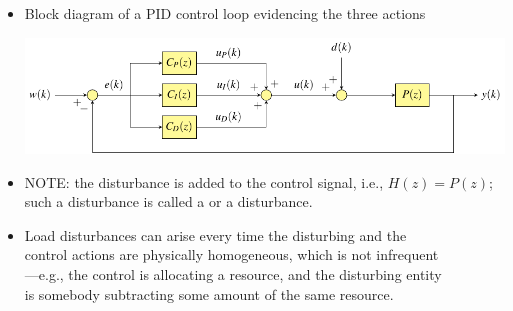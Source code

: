 \begin{frame}
\framesubtitleTC{}
\myPause
 \begin{itemize}[<+-| alert@+>]
 \item Block diagram of a PID control loop evidencing the three actions
       \begin{center}
        \includegraphics[width=0.85\columnwidth]{./Unit-07/img/PIDloop-actions.pdf}
       \end{center}
 \item \vspace{2mm}NOTE: the disturbance is added to the control signal, i.e., $H(z)=P(z)$;\\
       such a disturbance is called a  or a  disturbance.
 \item Load disturbances can arise every time the disturbing and the\\
       control actions are physically homogeneous, which is not infrequent\\
       ---e.g., the control is allocating a resource, and the disturbing entity\\
       is somebody subtracting some amount of the same resource.
 \end{itemize}
\end{frame}

